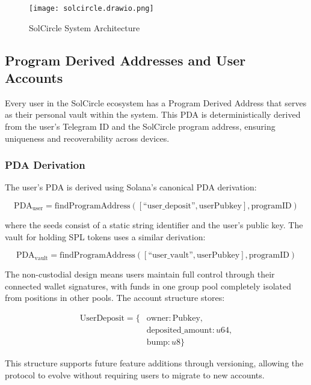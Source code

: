 \documentclass[11pt,a4paper]{article}
\begin{document}
\begin{figure}[h]
\centering
\texttt{[image: solcircle.drawio.png]}
\caption{SolCircle System Architecture}
\label{fig:your_label}
\end{figure}

\subsection{Program Derived Addresses and User Accounts}

Every user in the SolCircle ecosystem has a Program Derived Address that serves as their personal vault within the system. This PDA is deterministically derived from the user's Telegram ID and the SolCircle program address, ensuring uniqueness and recoverability across devices.

\subsubsection{PDA Derivation}

The user's PDA is derived using Solana's canonical PDA derivation:

\begin{equation}
\text{PDA}_{\text{user}} = \text{findProgramAddress}([\text{``user\_deposit''}, \text{userPubkey}], \text{programID})
\end{equation}

where the seeds consist of a static string identifier and the user's public key. The vault for holding SPL tokens uses a similar derivation:

\begin{equation}
\text{PDA}_{\text{vault}} = \text{findProgramAddress}([\text{``user\_vault''}, \text{userPubkey}], \text{programID})
\end{equation}

The non-custodial design means users maintain full control through their connected wallet signatures, with funds in one group pool completely isolated from positions in other pools. The account structure stores:

\begin{align}
\text{UserDeposit} = \{ &\text{owner}: \text{Pubkey}, \\
&\text{deposited\_amount}: u64, \\
&\text{bump}: u8 \}
\end{align}

This structure supports future feature additions through versioning, allowing the protocol to evolve without requiring users to migrate to new accounts.
\end{document}
